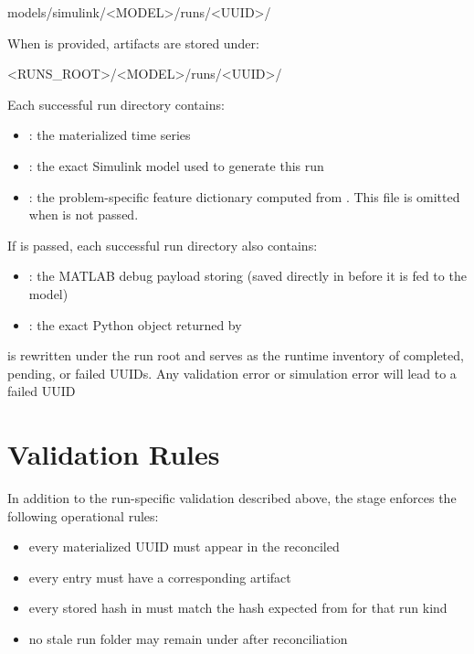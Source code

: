 \documentclass[11pt]{article}
\begin{document}
\begin{DocCode}
models/simulink/<MODEL>/runs/<UUID>/
\end{DocCode}

When  is provided, artifacts are stored under:

\begin{DocCode}
<RUNS_ROOT>/<MODEL>/runs/<UUID>/
\end{DocCode}

Each successful run directory contains:
\begin{itemize}
\item {}: the materialized time series
\item {}: the exact Simulink model used to generate this run
\item {}: the problem-specific feature dictionary computed from . This file is omitted when  is not passed.
\end{itemize}

If  is passed, each successful run directory also contains:
\begin{itemize}
\item {}: the MATLAB debug payload storing  (saved directly in  before it is fed to the model)
\item {}: the exact Python object returned by 
\end{itemize}

 is rewritten under the run root and serves as the runtime inventory of completed, pending, or failed UUIDs. Any validation error or simulation error will lead to a failed UUID



\section*{Validation Rules}

In addition to the run-specific validation described above, the stage enforces the following operational rules:

\begin{itemize}
\item every materialized UUID must appear in the reconciled 
\item every  entry must have a corresponding  artifact
\item every stored hash in  must match the hash expected from  for that run kind
\item no stale run folder may remain under  after reconciliation
\end{itemize}
\end{document}
